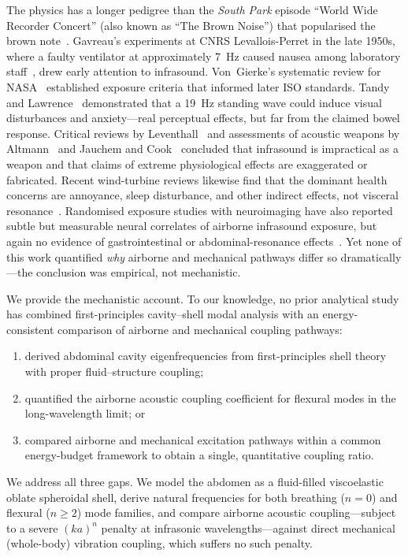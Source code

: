 The physics has a longer pedigree than the \emph{South Park} episode
``World Wide Recorder Concert'' (also known as ``The Brown Noise'') that
popularised the brown note~\cite{SouthPark2000BrownNoise}.  Gavreau's experiments at CNRS Levallois-Perret
in the late 1950s, where a faulty ventilator at approximately
\SI{7}{\hertz} caused nausea among laboratory
staff~\cite{Gavreau1966,Leventhall2007},
drew early attention to infrasound.  Von~Gierke's systematic review for
NASA~\cite{vonGierke1974,vonGierke2002} established exposure criteria that
informed later ISO standards.  Tandy and Lawrence~\cite{Tandy1998}
demonstrated that a \SI{19}{\hertz} standing wave could induce visual
disturbances and anxiety---real perceptual effects, but far from the claimed
bowel response.  Critical reviews by
Leventhall~\cite{Leventhall2003,Leventhall2007} and assessments of acoustic
weapons by Altmann~\cite{Altmann1999} and Jauchem and
Cook~\cite{Jauchem2007} concluded that infrasound is impractical as a weapon
and that claims of extreme physiological effects are exaggerated or
fabricated.  Recent wind-turbine reviews likewise find that the dominant
health concerns are annoyance, sleep disturbance, and other indirect effects,
not visceral resonance~\cite{vanKamp2021}.  Randomised exposure studies with
neuroimaging have also reported subtle but measurable neural correlates of
airborne infrasound exposure, but again no evidence of gastrointestinal or
abdominal-resonance effects~\cite{Ascone2021}.  Yet none of this work quantified \emph{why} airborne and
mechanical pathways differ so dramatically---the conclusion was empirical,
not mechanistic.

We provide the mechanistic account.  To our knowledge, no prior analytical study
has combined first-principles cavity--shell modal analysis with an
energy-consistent comparison of airborne and mechanical coupling pathways:
\begin{enumerate}
  \item derived abdominal cavity eigenfrequencies from first-principles
    shell theory with proper fluid--structure coupling;
  \item quantified the airborne acoustic coupling coefficient for flexural
    modes in the long-wavelength limit; or
  \item compared airborne and mechanical excitation pathways within a common
    energy-budget framework to obtain a single, quantitative coupling ratio.
\end{enumerate}

We address all three gaps.  We model the abdomen as a fluid-filled
viscoelastic oblate spheroidal shell, derive natural frequencies for both
breathing ($n=0$) and flexural ($n \geq 2$) mode families, and compare
airborne acoustic coupling---subject to a severe $(ka)^n$ penalty at
infrasonic wavelengths---against direct mechanical (whole-body) vibration
coupling, which suffers no such penalty.

